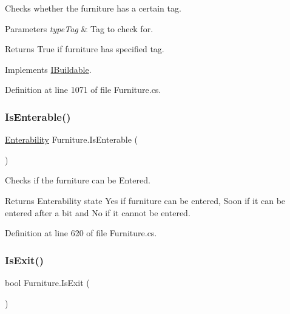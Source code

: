 Checks whether the furniture has a certain tag. 


\begin{DoxyParams}{Parameters}
{\em type\+Tag} & Tag to check for.\\
\hline
\end{DoxyParams}
\begin{DoxyReturn}{Returns}
True if furniture has specified tag.
\end{DoxyReturn}


Implements \hyperlink{interface_i_buildable_a4569a897fc2ac7c0ecfaddc518fa346f}{I\+Buildable}.



Definition at line 1071 of file Furniture.\+cs.

\mbox{\label{class_furniture_ac904b310f6d33670dd836b9c05da9496}} 
\subsubsection{\texorpdfstring{Is\+Enterable()}{IsEnterable()}}
{\footnotesize\ttfamily \hyperlink{_tile_8cs_a48a7177f465b04f310ccf25ae69d070a}{Enterability} Furniture.\+Is\+Enterable (\begin{DoxyParamCaption}{ }\end{DoxyParamCaption})}



Checks if the furniture can be Entered. 

\begin{DoxyReturn}{Returns}
Enterability state Yes if furniture can be entered, Soon if it can be entered after a bit and No if it cannot be entered.
\end{DoxyReturn}


Definition at line 620 of file Furniture.\+cs.

\mbox{\label{class_furniture_a88048e4444b4b10eb7826876798a4f0f}} 
\subsubsection{\texorpdfstring{Is\+Exit()}{IsExit()}}
{\footnotesize\ttfamily bool Furniture.\+Is\+Exit (\begin{DoxyParamCaption}{ }\end{DoxyParamCaption})}




